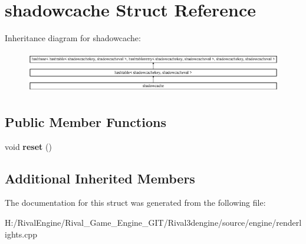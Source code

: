 \hypertarget{structshadowcache}{}\section{shadowcache Struct Reference}
\label{structshadowcache}
Inheritance diagram for shadowcache\+:\begin{figure}[H]
\begin{center}
\leavevmode
\includegraphics[height=1.852260cm]{structshadowcache}
\end{center}
\end{figure}
\subsection*{Public Member Functions}
\begin{DoxyCompactItemize}
\item 
\mbox{\label{structshadowcache_aaf22130ff099d5e605b7e99147d97d20}} 
void {\bfseries reset} ()
\end{DoxyCompactItemize}
\subsection*{Additional Inherited Members}


The documentation for this struct was generated from the following file\+:\begin{DoxyCompactItemize}
\item 
H\+:/\+Rival\+Engine/\+Rival\+\_\+\+Game\+\_\+\+Engine\+\_\+\+G\+I\+T/\+Rival3dengine/source/engine/renderlights.\+cpp\end{DoxyCompactItemize}
